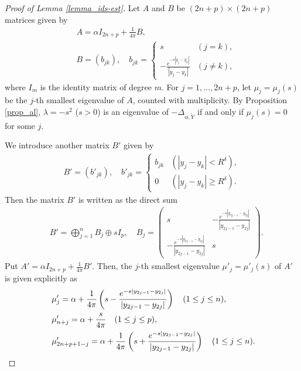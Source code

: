 \documentclass[12pt,a4paper]{article}
\begin{document}
\begin{proof}[Proof of Lemma \ref{lemma_ids-est}]
Let $A$ and $B$ be
$(2n+p)\times (2n+p)$ matrices given by
\begin{align*}
&\  A=\alpha I_{2n+p} + \frac{1}{4\pi}B,\\
&\ 
B=(b_{jk}),\quad
b_{jk}
=
\begin{cases}
 s & (j=k),\\
-\frac{e^{-s|y_j-y_k|}}{|y_j-y_k|}
&
(j\not=k),
\end{cases}
\end{align*}
where $I_m$ is the identity matrix of degree $m$.
For $j=1,\ldots,2n+p$, let $\mu_j=\mu_j(s)$ be the $j$-th smallest eigenvalue of $A$,
counted with multiplicity.
By Proposition \ref{prop_al},
$\lambda =-s^2$ ($s>0$) is an eigenvalue of 
$-\Delta_{\alpha,\widetilde{Y}}$
if and only if
$\mu_j(s)=0$ for some $j$.


We introduce another matrix $B'$ given by
\begin{align*}
 B'=(b'_{jk}),\quad
b'_{jk}=
\begin{cases}
 b_{jk} & (|y_j-y_k|<R^\delta),\\
 0 & (|y_j-y_k|\geq R^\delta).
\end{cases}
\end{align*}
Then the matrix $B'$ is written as the direct sum
\begin{align*}
&\ 
 B'=\bigoplus_{j=1}^{n}B_j \oplus s I_p,\quad
B_j
=
\begin{pmatrix}
 s & -\frac{e^{-s|y_{2j-1}-y_{2j}|}}{|y_{2j-1}-y_{2j}|}\\
-\frac{e^{-s|y_{2j-1}-y_{2j}|}}{|y_{2j-1}-y_{2j}|} & s
\end{pmatrix}.
\end{align*}
Put $A'=\alpha I_{2n+p}+\frac{1}{4\pi}B'$.
Then, the $j$-th smallest eigenvalue
$\mu'_j=\mu'_j(s)$ of $A'$ is given explicitly as
\begin{align}
 &\ \mu'_j
= 
\alpha+\frac{1}{4\pi}
\left(s-\frac{e^{-s|y_{2j-1}-y_{2j}|}}{|y_{2j-1}-y_{2j}|}\right)
\quad
(1\leq j \leq n),
\label{04_09}
\\
&\ \mu'_{n+j}=
\alpha+\frac{s}{4\pi}
\quad
(1\leq j \leq p),
\notag
\\
&\ \mu'_{2n+p+1-j}= 
\alpha+\frac{1}{4\pi}
\left(s+\frac{e^{-s|y_{2j-1}-y_{2j}|}}{|y_{2j-1}-y_{2j}|}\right)
\quad
(1\leq j \leq n).
\notag
\end{align}


\end{proof}
\end{document}
